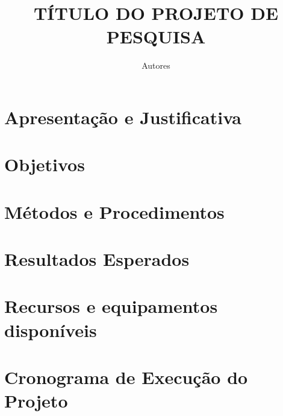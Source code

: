 \documentclass{projectUESPI}
\title{\color{red}TÍTULO DO PROJETO DE PESQUISA\color{black}}
\author{\color{red}Autores\color{black}}
\begin{document}
\maketitle
\newpage
\tableofcontents
\thispagestyle{empty}
\newpage
\setcounter{page}{1}

\section{Apresentação e Justificativa}

\newpage

\section{Objetivos}

\newpage

\section{Métodos e Procedimentos}

\newpage

\section{Resultados Esperados}

\newpage

\section{Recursos e equipamentos disponíveis}

\newpage

\section{Cronograma de Execução do Projeto}

\newpage



\newpage
\end{document}

